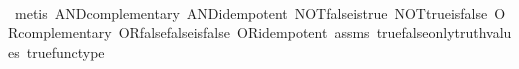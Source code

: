 \begin{isabellebody}
%
\isadelimproof
\ \ %
\endisadelimproof
%
\isatagproof
{}\isamarkupfalse%
\ {\isacharparenleft}{\kern0pt}metis\ AND{\isacharunderscore}{\kern0pt}complementary\ AND{\isacharunderscore}{\kern0pt}idempotent\ NOT{\isacharunderscore}{\kern0pt}false{\isacharunderscore}{\kern0pt}is{\isacharunderscore}{\kern0pt}true\ NOT{\isacharunderscore}{\kern0pt}true{\isacharunderscore}{\kern0pt}is{\isacharunderscore}{\kern0pt}false\ OR{\isacharunderscore}{\kern0pt}complementary\ OR{\isacharunderscore}{\kern0pt}false{\isacharunderscore}{\kern0pt}false{\isacharunderscore}{\kern0pt}is{\isacharunderscore}{\kern0pt}false\ OR{\isacharunderscore}{\kern0pt}idempotent\ assms\ true{\isacharunderscore}{\kern0pt}false{\isacharunderscore}{\kern0pt}only{\isacharunderscore}{\kern0pt}truth{\isacharunderscore}{\kern0pt}values\ true{\isacharunderscore}{\kern0pt}func{\isacharunderscore}{\kern0pt}type{\isacharparenright}{\kern0pt}%
\endisatagproof
{\isafoldproof}%
%
\isadelimproof
\isanewline
%
\endisadelimproof
%
\isadelimtheory
\ \isanewline
%
\endisadelimtheory
%
\isatagtheory
{}\isamarkupfalse%
%
\endisatagtheory
{\isafoldtheory}%
%
\isadelimtheory
%
\endisadelimtheory
%
\end{isabellebody}%
\endinput
